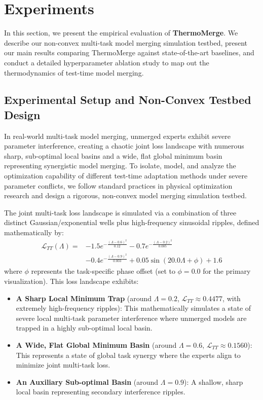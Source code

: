 \section{Experiments}
\label{sec:experiments}

In this section, we present the empirical evaluation of \textbf{ThermoMerge}.
We describe our non-convex multi-task model merging simulation testbed, present our main results comparing ThermoMerge against state-of-the-art baselines, and conduct a detailed hyperparameter ablation study to map out the thermodynamics of test-time model merging.

\subsection{Experimental Setup and Non-Convex Testbed Design}
In real-world multi-task model merging, unmerged experts exhibit severe parameter interference, creating a chaotic joint loss landscape with numerous sharp, sub-optimal local basins and a wide, flat global minimum basin representing synergistic model merging.
To isolate, model, and analyze the optimization capability of different test-time adaptation methods under severe parameter conflicts, we follow standard practices in physical optimization research and design a rigorous, non-convex model merging simulation testbed.

The joint multi-task loss landscape is simulated via a combination of three distinct Gaussian/exponential wells plus high-frequency sinusoidal ripples, defined mathematically by:
\begin{equation}
\begin{aligned}
    \mathcal{L}_{TT}(\Lambda) = &-1.5 e^{-\frac{(\Lambda - 0.6)^2}{0.12}} - 0.7 e^{-\frac{(\Lambda - 0.2)^2}{0.005}} \\
    &- 0.4 e^{-\frac{(\Lambda - 0.9)^2}{0.003}} + 0.05 \sin(20.0 \Lambda + \phi) + 1.6
\end{aligned}
\end{equation}
where $\phi$ represents the task-specific phase offset (set to $\phi = 0.0$ for the primary visualization). This loss landscape exhibits:
\begin{itemize}
\item \textbf{A Sharp Local Minimum Trap} (around $\Lambda = 0.2$, $\mathcal{L}_{TT} \approx 0.4477$, with extremely high-frequency ripples): This mathematically simulates a state of severe local multi-task parameter interference where unmerged models are trapped in a highly sub-optimal local basin.
\item \textbf{A Wide, Flat Global Minimum Basin} (around $\Lambda = 0.6$, $\mathcal{L}_{TT} \approx 0.1560$): This represents a state of global task synergy where the experts align to minimize joint multi-task loss.
    \item \textbf{An Auxiliary Sub-optimal Basin} (around $\Lambda = 0.9$): A shallow, sharp local basin representing secondary interference ripples.
\end{itemize}


